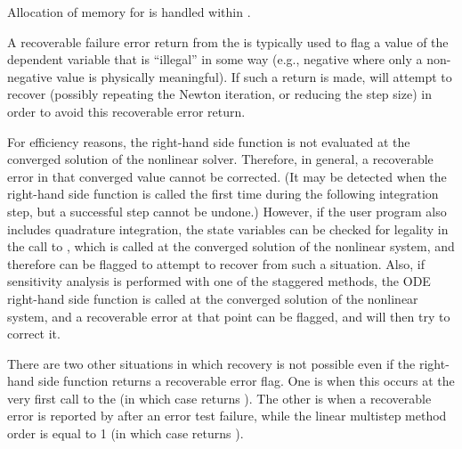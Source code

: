{
  Allocation of memory for  is handled within {\cvodes}.

  A recoverable failure error return from the  is typically used to
  flag a value of the dependent variable  that is ``illegal'' in
  some way (e.g., negative where only a non-negative value is physically
  meaningful).  If such a return is made, {\cvodes} will attempt to recover
  (possibly repeating the Newton iteration, or reducing the step size)
  in order to avoid this recoverable error return.

  For efficiency reasons, the right-hand side function is not evaluated
  at the converged solution of the nonlinear solver. Therefore, in general, a
  recoverable error in that converged value cannot be corrected.  (It may be
  detected when the right-hand side function is called the first time during
  the following integration step, but a successful step cannot be undone.) 
  However, if the user program also includes quadrature integration, the
  state variables can be checked for legality in the call to
  , which is called at the converged solution of the
  nonlinear system, and therefore {\cvodes} can be flagged to attempt
  to recover from such a situation. Also, if sensitivity analysis is
  performed with one of the staggered methods, the ODE right-hand side
  function is called at the converged solution of the nonlinear system,
  and a recoverable error at that point can be flagged, and {\cvodes}
  will then try to correct it.

  There are two other situations in which recovery is not possible
  even if the right-hand side function returns a recoverable error flag.
  One is when this occurs at the very first call to the 
  (in which case {\cvodes} returns ).
  The other is when a recoverable error is reported by 
  after an error test failure, while the linear multistep method order is
  equal to 1 (in which case {\cvodes} returns ).
}

